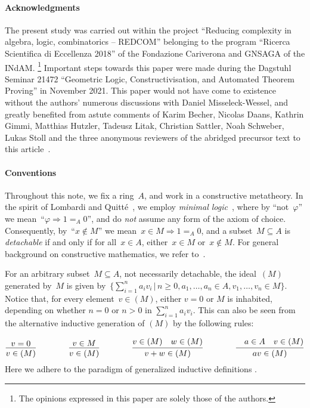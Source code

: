 \documentclass[com,11pt,crcready]{iosart2x}
\theoremstyle{definition}
\theoremstyle{plain}
\theoremstyle{remark}
\newcommand{\?}{\,{:}\,}
\renewcommand{\_}{\mathpunct{.}\,}
\begin{document}
\paragraph{Acknowledgments}
The present study was carried out within the project ``Reducing complexity in
algebra, logic, combinatorics -- REDCOM'' belonging to the program ``Ricerca
Scientifica di Eccellenza 2018'' of the Fondazione Cariverona and GNSAGA of the INdAM.%
\footnote{The opinions expressed in this paper are solely those of the
authors.} Important steps towards this paper were made
during the Dagstuhl Seminar 21472 ``Geometric Logic, Constructivisation, and
Automated Theorem Proving'' in November 2021. This paper would not have come to
existence without the authors' numerous discussions with Daniel Misseleck-Wessel, and
greatly benefited from astute comments of Karim Becher, Nicolas Daans, Kathrin Gimmi, Matthias Hutzler,
Tadeusz Litak, Christian Sattler,
Noah Schweber, Lukas Stoll and the three anonymous reviewers of the abridged
precursor text to this
article~\cite{blechschmidt-schuster:constructive-maximal-ideals}.

\paragraph{Conventions} Throughout this note, we fix a ring~$A$, and work in a constructive metatheory.
In the spirit of Lombardi and Quitté~\cite{lombardi-quitte:constructive-algebra}, we employ \emph{minimal
logic}~\cite{johansson:minimal}, where by ``not~$\varphi$'' we mean~``$\varphi \Rightarrow 1 =_A 0$'', and do \emph{not} assume any form of the axiom of choice. Consequently,
by~``$x \not\in M$'' we mean~$x \in M \Rightarrow 1 =_A 0$, and a subset~$M
\subseteq A$ is \emph{detachable} if and only if for all~$x \in A$, either~$x \in M$
or~$x \not\in M$. For general background on constructive mathematics, we refer
to~\cite{bauer:five-stages,bauer:int-mathematics,sep:constructive-mathematics}.

For an arbitrary subset~$M \subseteq A$, not necessarily
detachable, the ideal~$(M)$ generated by~$M$ is given by~$\bigl\{ \sum_{i=1}^n
a_i v_i \,\Big|\, n \geq 0, a_1,\ldots,a_n \in A, v_1,\ldots,v_n \in M \bigr\}$.
Notice that, for every element~$v \in (M)$, either $v = 0$ or $M$ is inhabited, depending on whether
$n=0$ or $n>0$ in $\sum_{i=1}^n a_i v_i$. This can also be seen from the alternative inductive
generation of $(M)$ by the following rules:\par
{\vspace*{-0.8em}\small\[
\infer{v \in (M)}{v=0}
\qquad\qquad
\infer{v \in (M)}{v \in M}
\qquad\qquad
\infer{v+w \in (M)}{v \in (M)\quad w \in (M)}
\qquad\qquad
\infer{av \in (M)}{\quad a\in A \quad v \in (M)}
\]}%
\noindent Here we adhere to the paradigm of generalized inductive definitions
\cite{aczel-rathjen:notes,aczel-rathjen:cstdraft,rathjen:genind,aczel:ind}.
\end{document}
